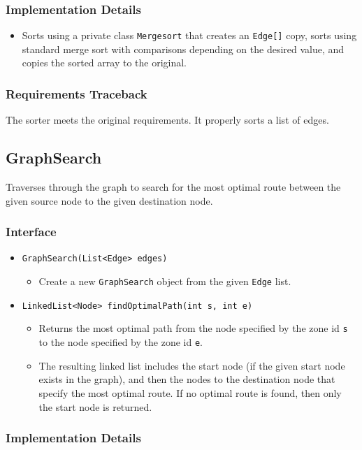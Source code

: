 \documentclass[12pt]{article}
\newcommand{\bi}{\begin{itemize}}
\newcommand{\ei}{\end{itemize}}
\newcommand{\code}[1]{\texttt{#1}}
\begin{document}
\subsubsection{Implementation Details}

\bi
    \item Sorts using a private class \code{Mergesort} that creates an \code{Edge[]} copy, sorts using standard merge sort with comparisons depending on the desired value, and copies the sorted array to the original. 
\ei

\subsubsection{Requirements Traceback}

The sorter meets the original requirements. It properly sorts a list of edges.

\newpage

\subsection{GraphSearch}

Traverses through the graph to search for the most optimal route between the given source node to the given destination node. 

\subsubsection{Interface}

\bi
	\item \code{GraphSearch(List<Edge> edges)}
	\bi
		\item Create a new \code{GraphSearch} object from the given \code{Edge} list.
	\ei
	\item \code{LinkedList<Node> findOptimalPath(int s, int e)}
	\bi
		\item Returns the most optimal path from the node specified by the zone id \code{s} to the node specified by the zone id \code{e}.
		\item The resulting linked list includes the start node (if the given start node exists in the graph), and then the nodes to the destination node that specify the most optimal route. If no optimal route is found, then only the start node is returned. 
	\ei
\ei

\subsubsection{Implementation Details}
\end{document}
